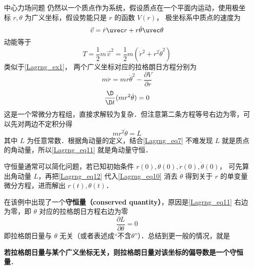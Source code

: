 \begin{exam}{中心力场问题}
仍然以一个质点作为系统，假设质点在一个平面内运动，使用极坐标 $r,\theta$ 为广义坐标，假设势能只是 $r$ 的函数 $V(r)$， 极坐标系中质点的速度为%
\begin{equation}\label{Lagrng_eq7}
\vec v = \dot r\uvec r + r\dot \theta \uvec \theta
\end{equation}
动能等于
\begin{equation}
T = \frac 12 m\vec v^2 = \frac{1}{2}m({\dot r^2} + {r^2}{\dot \theta ^2})
\end{equation}
类似于\autoref{Lagrng_ex1}， 两个广义坐标对应的拉格朗日方程分别为
\begin{equation}\label{Lagrng_eq10}
m\ddot r = mr{{\dot \theta }^2} - \frac{{\partial V}}{{\partial r}}
\end{equation}
\begin{equation}\label{Lagrng_eq11}
\frac{\D}{\D t} (m{r^2}\dot \theta)  = 0
\end{equation}
这是一个常微分方程组，直接求解较为复杂．但注意第二条方程等号右边为零，可以先对两边不定积分得
\begin{equation}\label{Lagrng_eq12}
mr^2\dot\theta = L
\end{equation}
其中 $L$ 为任意常数．根据角动量的定义，结合\autoref{Lagrng_eq7} 不难发现 $L$ 就是质点的角动量，所以\autoref{Lagrng_eq11} 就是角动量守恒．

守恒量通常可以简化问题，若已知初始条件 $r(0),\theta (0), \dot r(0),\dot \theta (0)$， 可先算出角动量 $L$，再把\autoref{Lagrng_eq12} 代入\autoref{Lagrng_eq10} 消去 $\dot\theta$ 得到关于 $r$ 的单变量微分方程，进而解出 $r(t),\theta (t)$．
\end{exam}

在该例中出现了一个\textbf{守恒量（conserved quantity）}，原因是\autoref{Lagrng_eq11} 右边为零，即 $\theta$ 对应的拉格朗日方程右边为零
\begin{equation}
\frac{{\partial L}}{{\partial \theta }} = 0
\end{equation}
即拉格朗日量与 $\theta$ 无关（或者表述成“不含$\theta$”）．总结到更一般的情况，就是

\textbf{若拉格朗日量与某个广义坐标无关，则拉格朗日量对该坐标的偏导数是一个守恒量}．

